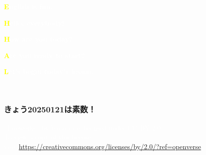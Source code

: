 \documentclass[aspectratio=169,xcolor={dvipsnames,table}]{beamer}
\makeatletter
\newcommand*{\themonth}{\two@digits\month}
\newcommand*{\theday}{\two@digits\day}
\newcommand{\mytoday}{{\the\year}--{\themonth}--{\theday}}
\makeatother
\begin{document}
\begin{frame}
\raggedleft
  \textcolor{white}{\Huge\bfseries \textcolor{yellow}{E}nglish is fun.}

\vfill

\vfill

\raggedleft
 \textcolor{white}{\LARGE\bfseries \textcolor{yellow}{H}ello, everybody!}

 \textcolor{white}{\LARGE\bfseries \textcolor{yellow}{H}ow are you today?}

\raggedleft
 \textcolor{white}{\LARGE\bfseries \textcolor{yellow}{A}re you ready to start?}

 \textcolor{white}{\LARGE\bfseries \textcolor{yellow}{L}et's begin today's lesson.}

\vfill

\raggedleft
 \textcolor{white}{\Large \bfseries \mytoday}

\hyperlink{today}{}
\end{frame}
%
%
%
%
\iffalse
\begin{frame}[plain]{20250107}
 \Large
\centering
\pause
\vfill
きょう$20250107$は素数\pause{}じゃない！\pause

$20{,}250{,}107=137\times{}147{,}811$\pause

ざんねん\pause

リラックスしていきましょう
\vfill
\raggedleft
\hyperlink{today}{\beamergotobutton{Today's Pronunciation}}
\end{frame}
\fi
{
  \begin{frame}[b]
    \frametitle{きょう20250121は素数！}
\tiny
\raggedright
  \textcolor{white}{ ``Fireworks'' by bayasaa is licensed under CC BY 2.0. }\\
   \textcolor{white}{To view a copy of this license,}\\
   \textcolor{white}{visit \url{https://creativecommons.org/licenses/by/2.0/?ref=openverse}.}
\hfill\hyperlink{today}{}
  \end{frame}
}
\end{document}
